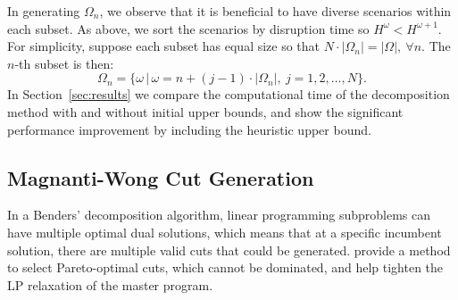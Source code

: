 \documentclass[11pt]{article}
\begin{document}
	In generating \(\Omega_n\), we observe that it is beneficial to have diverse scenarios within each subset.
	As above, we sort the scenarios by disruption time so $H^\omega < H^{\omega+1}$. For simplicity, suppose each subset has equal size so that \(N \cdot |\Omega_n| = |\Omega|, \ \forall n\). The \(n\)-th subset is then:
	\[\Omega_n = \{ \omega \, | \, \omega=n + (j - 1) \cdot |\Omega_n|,\ j = 1,2,\dots, N\}.\]
	In Section~\ref{sec:results} we compare the computational time of the decomposition method with and without initial upper bounds, and show the significant performance improvement by including the heuristic upper bound.
	
	\subsection{Magnanti-Wong Cut Generation} \label{subsec:MW}
	In a Benders' decomposition algorithm, linear programming subproblems can have multiple optimal dual solutions, which means that at a specific incumbent solution, there are multiple valid cuts that could be generated. \citet{magnanti1981accelerating} provide a method to select Pareto-optimal cuts, which cannot be dominated, 
	and help tighten the LP relaxation of the master program.
	
\end{document}
